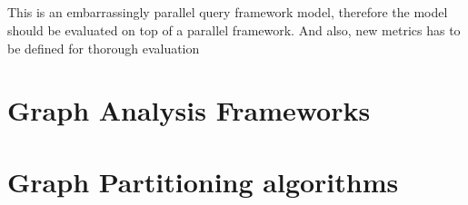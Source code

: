 \documentclass[12pt]{report}
\numberwithin{figure}{section}
\numberwithin{table}{section}
\begin{document}
\paragraph{}
This is an embarrassingly parallel query framework model, therefore the model should be evaluated on top of a parallel framework. And also, new metrics has to be defined for thorough evaluation

\newpage
\begin{appendices}


\chapter{Graph Analysis Frameworks}



\chapter{Graph Partitioning algorithms}




\end{appendices}
\end{document}
